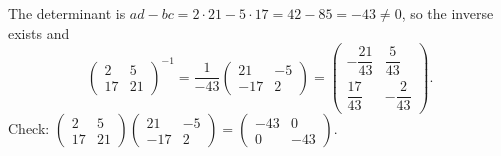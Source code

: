 The determinant is $ad-bc=2\cdot21-5\cdot17=42-85=-43\ne0$, so the inverse exists and
\[
\begin{pmatrix}2&5\\17&21\end{pmatrix}^{-1}=\dfrac{1}{-43}\begin{pmatrix}21&-5\\-17&2\end{pmatrix}
=\boxed{\begin{pmatrix}-\dfrac{21}{43}&\dfrac{5}{43}\\[2mm]\dfrac{17}{43}&-\dfrac{2}{43}\end{pmatrix}}.
\]
Check: $\begin{pmatrix}2&5\\17&21\end{pmatrix}\begin{pmatrix}21&-5\\-17&2\end{pmatrix}=\begin{pmatrix}-43&0\\0&-43\end{pmatrix}$.

